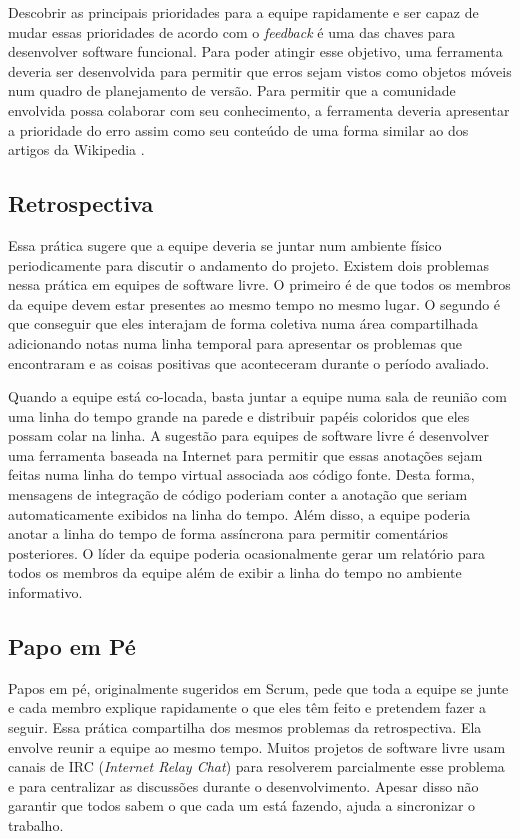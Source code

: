 Descobrir as principais prioridades para a equipe rapidamente e ser
capaz de mudar essas prioridades de acordo com o \emph{feedback} é uma
das chaves para desenvolver software funcional. Para poder atingir
esse objetivo, uma ferramenta deveria ser desenvolvida para permitir
que erros sejam vistos como objetos móveis num quadro de planejamento
de versão. Para permitir que a comunidade envolvida possa colaborar
com seu conhecimento, a ferramenta deveria apresentar a prioridade do
erro assim como seu conteúdo de uma forma similar ao dos artigos da
Wikipedia \cite{Surowiecki2004,Tapscott2006,Benkler2006}.

\subsection{Retrospectiva}
\label{subsec:retrospect}

Essa prática sugere que a equipe deveria se juntar num ambiente físico
periodicamente para discutir o andamento do projeto. Existem dois
problemas nessa prática em equipes de software livre. O primeiro é de
que todos os membros da equipe devem estar presentes ao mesmo tempo no
mesmo lugar.
O segundo é que conseguir que eles interajam de forma
coletiva numa área compartilhada adicionando notas numa linha temporal
para apresentar os problemas que encontraram e as coisas positivas que
aconteceram durante o período avaliado.

Quando a equipe está co-locada, basta juntar a equipe numa sala de
reunião com uma linha do tempo grande na parede e distribuir papéis
coloridos que eles possam colar na linha. A sugestão para equipes de
software livre é desenvolver uma ferramenta baseada na Internet para
permitir que essas anotações sejam feitas numa linha do tempo virtual
associada aos código fonte. Desta forma, mensagens de integração de
código poderiam conter a anotação que seriam automaticamente exibidos
na linha do tempo. Além disso, a equipe poderia anotar a linha do
tempo de forma assíncrona para permitir comentários posteriores. O
líder da equipe poderia ocasionalmente gerar um relatório para todos
os membros da equipe além de exibir a linha do tempo no ambiente
informativo.

\subsection{Papo em Pé}
\label{subsec:stand-up}

Papos em pé, originalmente sugeridos em Scrum, pede que toda a equipe
se junte e cada membro explique rapidamente o que eles têm feito e
pretendem fazer a seguir. Essa prática compartilha dos mesmos
problemas da retrospectiva. Ela envolve reunir a equipe ao mesmo
tempo. Muitos projetos de software livre usam canais de IRC
(\emph{Internet Relay Chat}) para resolverem parcialmente esse
problema e para centralizar as discussões durante o
desenvolvimento. Apesar disso não garantir que todos sabem o que cada
um está fazendo, ajuda a sincronizar o trabalho.


